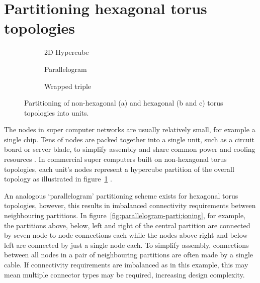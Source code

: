 	\section{Partitioning hexagonal torus topologies}
		
		\begin{figure}
			\center
			\begin{subfigure}[b]{0.32\textwidth}
				\center
				\caption{2D Hypercube}
				\label{fig:hypercube-partitioning}
			\end{subfigure}
			\begin{subfigure}[b]{0.32\textwidth}
				\center
				\caption{Parallelogram}
				\label{fig:parallelogram-partitioning}
			\end{subfigure}
			\begin{subfigure}[b]{0.32\textwidth}
				\center
				\caption{Wrapped triple}
				\label{fig:wrapped-triple-partitioning}
			\end{subfigure}
			
			\caption[Partitioning of torus topologies into units.]%
			{Partitioning of non-hexagonal (a) and hexagonal (b and c) torus
			topologies into units.}
			\label{fig:partitioning-options}
		\end{figure}
		
		The nodes in super computer networks are usually relatively small, for
		example a single chip. Tens of nodes are packed together into a single
		unit, such as a circuit board or server blade, to simplify assembly and
		share common power and cooling resources \cite{gilge14,ajima12}. In
		commercial super computers built on non-hexagonal torus topologies, each
		unit's nodes represent a hypercube partition of the overall topology as
		illustrated in figure~\ref{fig:hypercube-partitioning}
		\cite{chen11,ajima12}.
		
		An analogous `parallelogram' partitioning scheme exists for hexagonal torus
		topologies, however, this results in imbalanced connectivity requirements
		between neighbouring partitions. In
		figure~\ref{fig:parallelogram-parti;ioning}, for example, the partitions
		above, below, left and right of the central partition are connected by
		seven node-to-node connections each while the nodes above-right and
		below-left are connected by just a single node each. To simplify assembly,
		connections between all nodes in a pair of neighbouring partitions are
		often made by a single cable. If connectivity requirements are imbalanced
		as in this example, this may mean multiple connector types may be required,
		increasing design complexity.
		
